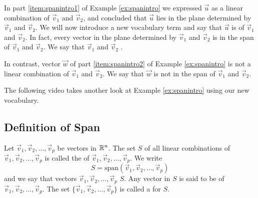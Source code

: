 \documentclass{ximera}
\begin{document}
\begin{example}
\begin{explanation}
\begin{center}
\end{center}
  
  \end{explanation}
\end{example}

In part \ref{item:spanintro1} of Example \ref{ex:spanintro} we expressed $\vec{u}$ as a linear combination of $\vec{v}_1$ and $\vec{v}_2$, and concluded that $\vec{u}$ lies in the plane determined by $\vec{v}_1$ and $\vec{v}_2$.  We will now introduce a new vocabulary term and say that $\vec{u}$ is  of $\vec{v}_1$ and $\vec{v}_2$.  In fact, every vector in the plane determined by $\vec{v}_1$ and $\vec{v}_2$ is in the span of $\vec{v}_1$ and $\vec{v}_2$.  We say that $\vec{v}_1$ and $\vec{v}_2$ .

In contrast, vector $\vec{w}$ of part \ref{item:spanintro2} of Example \ref{ex:spanintro} is not a linear combination of $\vec{v}_1$ and $\vec{v}_2$.  We say that $\vec{w}$ is not in the span of $\vec{v}_1$ and $\vec{v}_2$.

The following video takes another look at Example \ref{ex:spanintro} using our new vocabulary.


\subsection*{Definition of Span}

\begin{definition}\label{def:span} Let $\vec{v}_1, \vec{v}_2,\ldots ,\vec{v}_p$ be vectors in $\mathbb{R}^n$.  The set $S$ of all linear combinations of $\vec{v}_1, \vec{v}_2,\ldots ,\vec{v}_p$ is called the  of $\vec{v}_1, \vec{v}_2,\ldots ,\vec{v}_p$.  We write 
$$S=\mbox{span}(\vec{v}_1, \vec{v}_2,\ldots ,\vec{v}_p)$$
and we say that vectors $\vec{v}_1, \vec{v}_2,\ldots ,\vec{v}_p$  $S$.  Any vector in $S$ is said to be  of $\vec{v}_1, \vec{v}_2,\ldots ,\vec{v}_p$.  The set $\{\vec{v}_1, \vec{v}_2,\ldots ,\vec{v}_p\}$ is called a  for $S$.
\end{definition}
\end{document}
